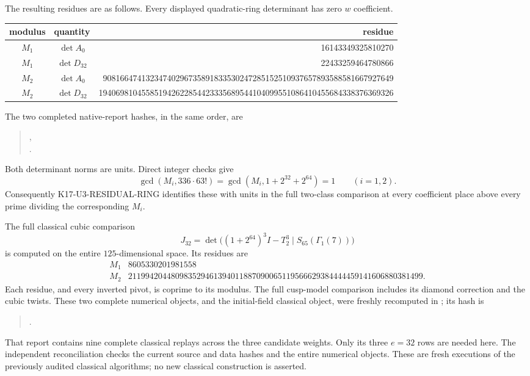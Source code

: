 \documentclass[11pt,a4paper]{article}
\theoremstyle{definition}
\begin{document}
The resulting residues are as follows.  Every displayed
quadratic-ring determinant has zero $w$ coefficient.
\begin{center}\small\setlength{\tabcolsep}{5pt}
\begin{tabular}{c|c|r}
modulus&quantity&residue\\\hline
$M_1$&$\det A_0$&16143349325810270\\
$M_1$&$\det D_{32}$&22433259464780866\\
$M_2$&$\det A_0$&90816647413234740296735891833530247285152510937657893588581667927649\\
$M_2$&$\det D_{32}$&194069810455851942622854423335689544104099551086410455684338376369326
\end{tabular}
\end{center}
The two completed native-report hashes, in the same order,
are
\begin{quote}\small
{},\\
.
\end{quote}
Both determinant norms are units.  Direct integer checks give
\[
 \gcd(M_i,336\cdot63!)=
 \gcd(M_i,1+2^{32}+2^{64})=1\qquad(i=1,2).                 \tag{KN.4}
\]
Consequently K17-U3-RESIDUAL-RING identifies these with units
in the full two-class comparison at every coefficient place
above every prime dividing the corresponding $M_i$.

The full classical cubic comparison
\[
 J_{32}=\det\bigl((1+2^{64})^3I-T_2^3\mid
                                  S_{65}(\Gamma_1(7))\bigr)
                                                                  \tag{KN.5}
\]
is computed on the entire $125$-dimensional space.  Its residues
are
\[
\begin{array}{c|r}
 M_1&8605330201981558\\
 M_2&211994204480983529461394011887090065119566629384444459141606880381499.
\end{array}                                                   \tag{KN.6}
\]
Each residue, and every inverted pivot, is coprime to its
modulus.  The full cusp-model comparison includes its diamond
correction and the cubic twists.  These two complete numerical
objects, and the initial-field classical object, were freshly
recomputed in ; its hash is
\begin{quote}\small
{}.
\end{quote}
That report contains nine complete classical replays across
the three candidate weights.  Only its three $e=32$ rows are
needed here.  The independent reconciliation checks the
current source and data hashes and the entire numerical
objects.  These are fresh executions of the previously audited
classical algorithms; no new classical construction is asserted.
\end{document}
